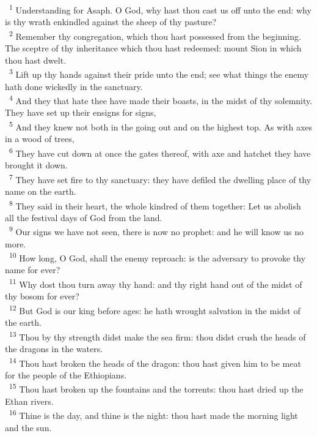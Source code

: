 \documentclass[a5paper,12pt]{article}
\begin{document}
\begin{multicols*}{2}
~\textsuperscript{1} Understanding for Asaph. O God, why hast thou cast us off unto the end: why is thy wrath enkindled against the sheep of thy pasture?\\
~\textsuperscript{2} Remember thy congregation, which thou hast possessed from the beginning. The sceptre of thy inheritance which thou hast redeemed: mount Sion in which thou hast dwelt.\\
~\textsuperscript{3} Lift up thy hands against their pride unto the end; see what things the enemy hath done wickedly in the sanctuary.\\
~\textsuperscript{4} And they that hate thee have made their boasts, in the midst of thy solemnity. They have set up their ensigns for signs,\\
~\textsuperscript{5} And they knew not both in the going out and on the highest top. As with axes in a wood of trees,\\
~\textsuperscript{6} They have cut down at once the gates thereof, with axe and hatchet they have brought it down.\\
~\textsuperscript{7} They have set fire to thy sanctuary: they have defiled the dwelling place of thy name on the earth.\\
~\textsuperscript{8} They said in their heart, the whole kindred of them together: Let us abolish all the festival days of God from the land.\\
~\textsuperscript{9} Our signs we have not seen, there is now no prophet: and he will know us no more.\\
~\textsuperscript{10} How long, O God, shall the enemy reproach: is the adversary to provoke thy name for ever?\\
~\textsuperscript{11} Why dost thou turn away thy hand: and thy right hand out of the midst of thy bosom for ever?\\
~\textsuperscript{12} But God is our king before ages: he hath wrought salvation in the midst of the earth.\\
~\textsuperscript{13} Thou by thy strength didst make the sea firm: thou didst crush the heads of the dragons in the waters.\\
~\textsuperscript{14} Thou hast broken the heads of the dragon: thou hast given him to be meat for the people of the Ethiopians.\\
~\textsuperscript{15} Thou hast broken up the fountains and the torrents: thou hast dried up the Ethan rivers.\\
~\textsuperscript{16} Thine is the day, and thine is the night: thou hast made the morning light and the sun.\\

\end{multicols*}
\end{document}
